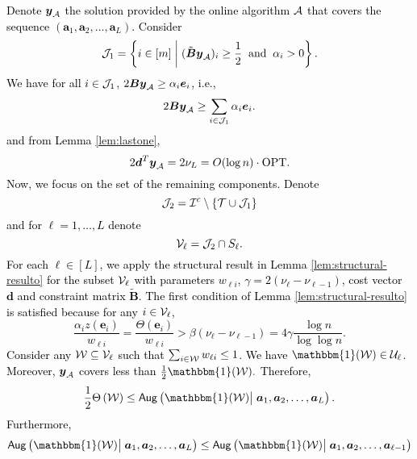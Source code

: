 \documentclass[moor]{informs1}              %
\newcommand{\opt}{\mathrm{OPT}}
\newcommand{\mb}[1]{\ensuremath{\boldsymbol{#1}}}
\newcommand*{\red}{\textcolor{black}}
\begin{document}
\red{
Denote $\mb y_{\cal A}$ the solution provided by the online algorithm ${\cal A}$ that covers the sequence $(\mb a_1, \mb a_2, \ldots, \mb a_L)$. %
Consider
$$ {\cal J}_1 = \left\{ i \in [m] \; \bigg\vert \; ( \tilde{\mb B} \mb y_{\cal A})_i \geq \frac{1}{2}    \; \; \text{and} \; \; \alpha_i > 0 \right\}.$$
We have for all $i \in {\cal J}_1$,  $ 2 {\mb B} \mb  y_{\cal A} \geq \alpha_i \mb e_i $, i.e.,
$$ 2 {\mb B} \mb  y_{\cal A} \geq \sum_{i \in {\cal J}_1} \alpha_i \mb e_i .$$
and from Lemma \ref{lem:lastone},  
$$ 2 \mb d^T \mb y_{\cal A} = 2 {\nu}_L = O( \log n) \cdot \opt.$$ 
Now, we focus on the set of the remaining components. Denote
$${\cal J}_2= {\cal I}^c \setminus  \{  {\cal T} \cup {\cal J}_1    \}$$
and for $\ell =1, \ldots,L$ denote
$${{\cal V}}_{\ell}= {\cal J}_2 \cap S_{\ell}.$$
For each $\ell \in [L]$, we apply  the structural result in Lemma \ref{lem:structural-resulto} for the subset ${ \cal V}_{\ell}$ with parameters $ w_{\ell i} $, $ \gamma = 2 ( {\nu}_{\ell}- {\nu}_{\ell -1})$, cost vector $\mb d$ and constraint matrix $\tilde{\mb B} $. The first condition of Lemma \ref{lem:structural-resulto} is satisfied because for any $i \in { \cal V}_{\ell}$,
$$ \frac{\alpha_i z( \mb e_i )}{w_{\ell i}}  = \frac{\Theta( \mb e_i )}{w_{\ell i}}   > \beta ( {\nu}_{\ell}- {\nu}_{\ell -1}) = 4 \gamma \frac{\log n }{\log \log n}  .$$
Consider any ${\cal W} \subseteq {\cal V}_{\ell} $ such that $ \sum_{i \in {\cal W}} w_{\ell i}   \leq 1$. We have  $\mathbbm{1}({\cal W}) \in {\cal U}_{\ell}$. Moreover, $\mb y_{\cal A}$ covers less than $\frac{1}{2}\mathbbm{1}({\cal W}).$ Therefore,
$$
\frac{1}{2} \Theta\left({\cal W}\right)   \leq    {{\sf Aug} }\left( \mathbbm{1}({\cal W})  \big\vert \; \mb a_1, \mb a_2, \ldots , \mb a_L \right). \\
$$
Furthermore, 
\begin{align*}
{{\sf Aug} } \left( \mathbbm{1}({\cal W})  \big\vert \; \mb a_1, \mb a_2, \ldots , \mb a_L \right) &\leq   {{\sf Aug} }\left( \mathbbm{1}({\cal W}) \big\vert \; \mb a_1, \mb a_2, \ldots , \mb a_{\ell-1} \right) \\

\end{align*}}
\end{document}
